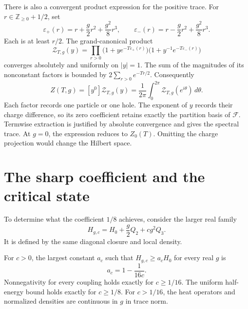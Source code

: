 There is also a convergent product expression for the positive trace.
For \(r\in\mathbb Z_{\geq0}+1/2\), set
\[
 \varepsilon_+(r)=r+\frac g2r^2+\frac{g^2}{8}r^3,
 \qquad
 \varepsilon_-(r)=r-\frac g2r^2+\frac{g^2}{8}r^3.
\]
Each is at least \(r/2\). The grand-canonical product
\begin{equation}\label{eq:vol2-local-grand-product}
 \mathcal Z_{T,g}(y)=\prod_{r>0}
 \bigl(1+y e^{-T\varepsilon_+(r)}\bigr)
 \bigl(1+y^{-1}e^{-T\varepsilon_-(r)}\bigr)
\end{equation}
converges absolutely and uniformly on \(|y|=1\). The sum of
the magnitudes of its nonconstant factors is bounded by
\(2\sum_{r>0}e^{-Tr/2}\). Consequently
\begin{equation}\label{eq:vol2-charge-projected-trace}
 Z(T,g)=[y^0]\mathcal Z_{T,g}(y)
       =\frac1{2\pi}\int_0^{2\pi}\mathcal Z_{T,g}(e^{i\theta})\,d\theta.
\end{equation}
Each factor records one particle or one hole. The exponent of \(y\)
records their charge difference, so its zero coefficient retains
exactly the partition basis of \(\mathcal F\). Termwise extraction
is justified by absolute convergence and gives the spectral trace.
At \(g=0\), the expression reduces to \(Z_0(T)\). Omitting the
charge projection would change the Hilbert space.

\section{The sharp coefficient and the critical state}

To determine what the coefficient \(1/8\) achieves, consider
the larger real family
\[
 H_{g,c}=H_0+\frac g2Q_2+c g^2Q_3.
\]
It is defined by the same diagonal closure and local density.

\begin{proposition}\label{prop:vol2-sharp-stabilization}
For \(c>0\), the largest constant \(a_c\) such that
\(H_{g,c}\geq a_cH_0\) for every real \(g\) is
\[
 a_c=1-\frac1{16c}.
\]
Nonnegativity for every coupling holds exactly for \(c\geq1/16\).
The uniform half-energy bound holds exactly for \(c\geq1/8\).
For \(c>1/16\), the heat operators and normalized densities
are continuous in \(g\) in trace norm.
\end{proposition}

